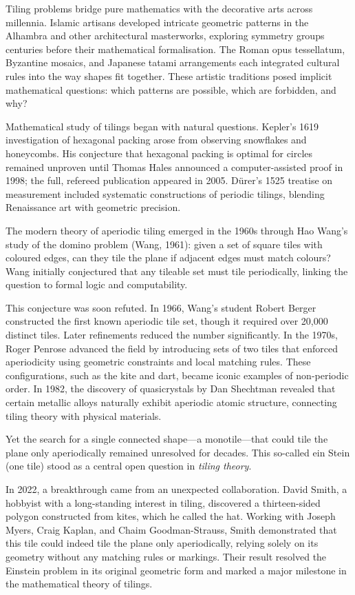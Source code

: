 \begin{historical}
Tiling problems bridge pure mathematics with the decorative arts across millennia. Islamic artisans developed intricate geometric patterns in the Alhambra and other architectural masterworks, exploring symmetry groups centuries before their mathematical formalisation. The Roman opus tessellatum, Byzantine mosaics, and Japanese tatami arrangements each integrated cultural rules into the way shapes fit together. These artistic traditions posed implicit mathematical questions: which patterns are possible, which are forbidden, and why?

Mathematical study of tilings began with natural questions. Kepler's 1619 investigation of hexagonal packing arose from observing snowflakes and honeycombs. His conjecture that hexagonal packing is optimal for circles remained unproven until Thomas Hales announced a computer-assisted proof in 1998; the full, refereed publication appeared in 2005. Dürer's 1525 treatise on measurement included systematic constructions of periodic tilings, blending Renaissance art with geometric precision.

The modern theory of aperiodic tiling emerged in the 1960s through Hao Wang's study of the domino problem (Wang, 1961): given a set of square tiles with coloured edges, can they tile the plane if adjacent edges must match colours? Wang initially conjectured that any tileable set must tile periodically, linking the question to formal logic and computability.

This conjecture was soon refuted. In 1966, Wang’s student Robert Berger constructed the first known aperiodic tile set, though it required over 20,000 distinct tiles. Later refinements reduced the number significantly. In the 1970s, Roger Penrose advanced the field by introducing sets of two tiles that enforced aperiodicity using geometric constraints and local matching rules. These configurations, such as the kite and dart, became iconic examples of non-periodic order. In 1982, the discovery of quasicrystals by Dan Shechtman revealed that certain metallic alloys naturally exhibit aperiodic atomic structure, connecting tiling theory with physical materials.

Yet the search for a single connected shape—a monotile—that could tile the plane only aperiodically remained unresolved for decades. This so-called \QSOpen{}ein Stein\QSClose{} (\QSOpen{}one tile\QSClose{}) stood as a central open question in \textit{tiling theory}.

In 2022, a breakthrough came from an unexpected collaboration. David Smith, a hobbyist with a long-standing interest in tiling, discovered a thirteen-sided polygon constructed from kites, which he called the \QSOpen{}hat.\QSClose{} Working with Joseph Myers, Craig Kaplan, and Chaim Goodman-Strauss, Smith demonstrated that this tile could indeed tile the plane only aperiodically, relying solely on its geometry without any matching rules or markings. Their result resolved the Einstein problem in its original geometric form and marked a major milestone in the mathematical theory of tilings.
\end{historical}
